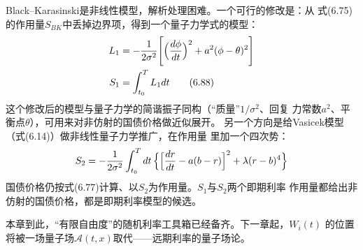 Black--Karasinski是非线性模型，解析处理困难。一个可行的修改是：从
式(6.75)的作用量$S_{BK}$中丢掉边界项，得到一个量子力学式的模型：
\begin{align*}
L_1&=-\frac{1}{2\sigma^2}\Biggl[\Bigl(\frac{d\phi}{dt}\Bigr)^2
+a^2(\phi-\theta)^2\Biggr]\\
S_1&=\int_{t_0}^{T}L_1dt
\tag{6.88}
\end{align*}
这个修改后的模型与量子力学的简谐振子同构（“质量”$1/\sigma^2$、回复
力常数$a^2$、平衡点$\theta$），可用来对非仿射的国债价格做近似展开。
另一个方向是给Vasicek模型（式(6.14)）做非线性量子力学推广，在作用量
里加一个四次势：
\begin{equation*}
S_2=-\frac{1}{2\sigma^2}\int_{t_0}^{T}dt\,
\Bigl\{\Bigl[\frac{dr}{dt}-a(b-r)\Bigr]^2+\lambda(r-b)^4\Bigr\}
\end{equation*}
国债价格仍按式(6.77)计算、以$S_2$为作用量。$S_1$与$S_2$两个即期利率
作用量都给出非仿射的国债价格，都是即期利率模型的候选。

本章到此，“有限自由度”的随机利率工具箱已经备齐。下一章起，$W_i(t)$
的位置将被一场量子场$\mathcal{A}(t,x)$取代——远期利率的量子场论。

